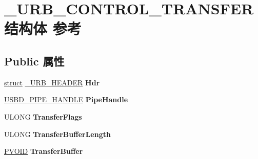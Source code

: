 \hypertarget{struct___u_r_b___c_o_n_t_r_o_l___t_r_a_n_s_f_e_r}{}\section{\+\_\+\+U\+R\+B\+\_\+\+C\+O\+N\+T\+R\+O\+L\+\_\+\+T\+R\+A\+N\+S\+F\+E\+R结构体 参考}
\label{struct___u_r_b___c_o_n_t_r_o_l___t_r_a_n_s_f_e_r}
\subsection*{Public 属性}
\begin{DoxyCompactItemize}
\item 
\mbox{\label{struct___u_r_b___c_o_n_t_r_o_l___t_r_a_n_s_f_e_r_ad23b851047a8b0d4dfdcfdfff6422107}} 
\hyperlink{interfacestruct}{struct} \hyperlink{struct___u_r_b___h_e_a_d_e_r}{\+\_\+\+U\+R\+B\+\_\+\+H\+E\+A\+D\+ER} {\bfseries Hdr}
\item 
\mbox{\label{struct___u_r_b___c_o_n_t_r_o_l___t_r_a_n_s_f_e_r_a76377c88f1d6f5313ad61bcfd8401bdb}} 
\hyperlink{interfacevoid}{U\+S\+B\+D\+\_\+\+P\+I\+P\+E\+\_\+\+H\+A\+N\+D\+LE} {\bfseries Pipe\+Handle}
\item 
\mbox{\label{struct___u_r_b___c_o_n_t_r_o_l___t_r_a_n_s_f_e_r_a87c842627ef486d4128a874f0a7a17f8}} 
U\+L\+O\+NG {\bfseries Transfer\+Flags}
\item 
\mbox{\label{struct___u_r_b___c_o_n_t_r_o_l___t_r_a_n_s_f_e_r_a9ba50eaa5c480199a14bd22739e70478}} 
U\+L\+O\+NG {\bfseries Transfer\+Buffer\+Length}
\item 
\mbox{\label{struct___u_r_b___c_o_n_t_r_o_l___t_r_a_n_s_f_e_r_abf47f828478cb5f331ccfca6638e8aec}} 
\hyperlink{interfacevoid}{P\+V\+O\+ID} {\bfseries Transfer\+Buffer}
\item 
\mbox{\label{struct___u_r_b___c_o_n_t_r_o_l___t_r_a_n_s_f_e_r_a080d001d7725278e950950ee09effb53}} 

\end{DoxyCompactItemize}
